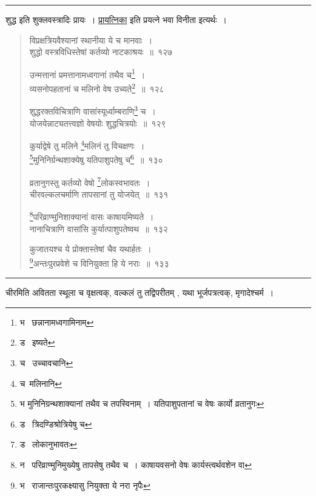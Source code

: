 \documentclass[11pt, openany]{book}
\begin{document}
\hrule

\vspace{2mm}
शुद्ध इति शुक्लवस्त्रादिः प्रायः~। \underline{प्रायत्निका} इति प्रयत्ने भवा विनीता इत्यर्थः~।


\newpage
\lfoot{}

\begin{quote}
{\na विप्रक्षत्रियवैश्यानां स्थानीया ये च मानवाः~।\\
शुद्धो वस्त्रविधिस्तेषां कर्तव्यो नाटकाश्रयः~॥~१२७

उन्मत्तानां प्रमत्तानामध्वगानां तथैव च\renewcommand{\thefootnote}{1}\footnote{भ \textendash\ छन्नानामध्वगामिनाम्}~।\\
व्यसनोपहतानां च मलिनो वेष उच्यते\renewcommand{\thefootnote}{2}\footnote{ड \textendash\ इष्यते}~॥~१२८

शुद्धरक्तविचित्राणि वासांस्यूर्ध्वाम्बराणि\renewcommand{\thefootnote}{3}\footnote{च \textendash\ उच्चावचानि} च~।\\
योजयेन्नाट्यतत्त्वज्ञो वेषयोः शुद्धचित्रयोः~॥~१२९

कुर्याद्वेषे तु मलिने \renewcommand{\thefootnote}{4}\footnote{च\textendash\ मलिनानि}मलिनं तु विचक्षणः~।\\
\renewcommand{\thefootnote}{5}\footnote{भ मुनिनिग्रन्थशाक्यानां तथैव च तपस्विनाम्~। यतिपाशुपतानां च वेषः कार्यो व्रतानुगः}मुनिनिर्ग्रन्थशाक्येषु यतिपाशुपतेषु च\renewcommand{\thefootnote}{6}\footnote{ड \textendash\ त्रिदण्डिश्रोत्रियेषु च}~॥~१३०

व्रतानुगस्तु कर्तव्यो वेषो \renewcommand{\thefootnote}{7}\footnote{ड \textendash\ लोकानुभावतः}लोकस्वभावतः~।\\
चीरवल्कलचर्माणि तापसानां तु योजयेत्~॥~१३१

\renewcommand{\thefootnote}{8}\footnote{न \textendash\ परिव्राण्मुनिमुख्येषु तापसेषु तथैव च~। काषायवसनो वेषः कार्यस्त्वर्थवशेन वा}परिव्राण्मुनिशाक्यानां वासः काषायमिष्यते~।\\
नानाचित्राणि वासांसि कुर्यात्पाशुपतेष्वथ~॥~१३२

कुजातयश्च ये प्रोक्तास्तेषां चैव यथार्हतः~।\\
\renewcommand{\thefootnote}{9}\footnote{भ \textendash\ राजान्तःपुरकक्ष्यासु नियुक्ता ये नरा नृपैः}अन्तःपुरप्रवेशे च विनियुक्ता हि ये नराः~॥~१३३}
\end{quote}

\hrule

\vspace{2mm}
चीरमिति अवितता स्थूला च वृक्षत्वक्, वल्कलं तु तद्विपरीतम् , यथा भूर्जपत्रत्वक्, मृगादेश्चर्म~।
\end{document}
